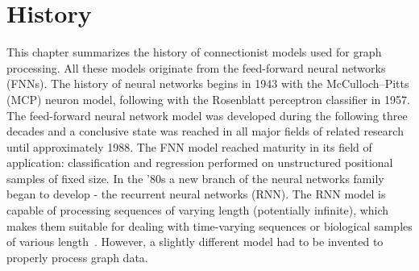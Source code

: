 
\chapter{History}
This chapter summarizes the history of connectionist models used for graph processing. All these models originate from the feed-forward neural networks (FNNs). The history of neural networks begins in 1943 with the McCulloch–Pitts (MCP) neuron model, following with the Rosenblatt perceptron classifier in 1957. The feed-forward neural network model was developed during the following three decades and a conclusive state was reached in all major fields of related research until approximately 1988. The FNN model reached maturity in its field of application: classification and regression performed on unstructured positional samples of fixed size. In the '80s a new branch of the neural networks family began to develop - the recurrent neural networks (RNN). The RNN model is capable of processing sequences of varying length (potentially infinite), which makes them suitable for dealing with time-varying sequences or biological samples of various length~\cite{saha2006prediction}. However, a slightly different model had to be invented to properly process graph data.

